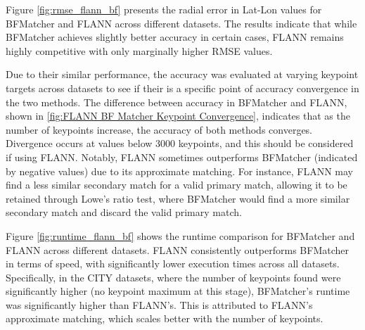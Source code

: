 Figure \ref{fig:rmse_flann_bf} presents the radial error in Lat-Lon values for BFMatcher and FLANN across different datasets. The results indicate that while BFMatcher achieves slightly better accuracy in certain cases, FLANN remains highly competitive with only marginally higher RMSE values.

Due to their similar performance, the accuracy was evaluated at varying keypoint targets across datasets to see if their is a specific point of accuracy convergence in the two methods. The difference between accuracy in BFMatcher and FLANN, shown in \ref{fig:FLANN BF Matcher Keypoint Convergence}, indicates that as the number of keypoints increase, the accuracy of both methods converges. Divergence occurs at values below 3000 keypoints, and this should be considered if using FLANN. Notably, FLANN sometimes outperforms BFMatcher (indicated by negative values) due to its approximate matching. For instance, FLANN may find a less similar secondary match for a valid primary match, allowing it to be retained through Lowe's ratio test, where BFMatcher would find a more similar secondary match and discard the valid primary match.

Figure \ref{fig:runtime_flann_bf} shows the runtime comparison for BFMatcher and FLANN across different datasets. FLANN consistently outperforms BFMatcher in terms of speed, with significantly lower execution times across all datasets. Specifically, in the CITY datasets, where the number of keypoints found were significantly higher (no keypoint maximum at this stage), BFMatcher's runtime was significantly higher than FLANN's. This is attributed to FLANN's approximate matching, which scales better with the number of keypoints. 

